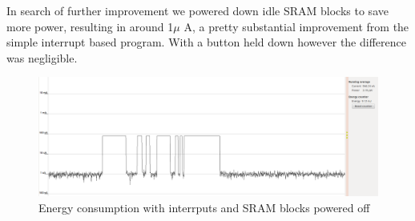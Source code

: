 In search of further improvement we powered down idle SRAM blocks to save more power, resulting in around 1$\mu$ A, a pretty substantial improvement from the simple interrupt based program. With a button held down however the difference was negligible.

\begin{figure}[ht]
 \centering
 \includegraphics[width=\textwidth]{images/performance_interrupts_sram_idle.png}
 \caption{Energy consumption with interrputs and SRAM blocks powered off}
\end{figure}

